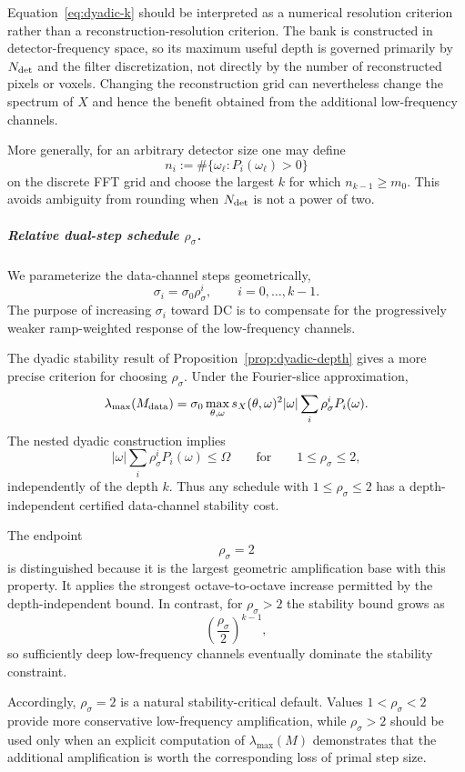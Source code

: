 \documentclass{article}
\begin{document}
Equation~\eqref{eq:dyadic-k} should be interpreted as a numerical
resolution criterion rather than a reconstruction-resolution
criterion.  The bank is constructed in detector-frequency space, so
its maximum useful depth is governed primarily by $N_{\rm det}$ and
the filter discretization, not directly by the number of reconstructed
pixels or voxels.  Changing the reconstruction grid can nevertheless
change the spectrum of $X$ and hence the benefit obtained from the
additional low-frequency channels.

More generally, for an arbitrary detector size one may define
\[
n_i
:=
\#\{\omega_\ell:P_i(\omega_\ell)>0\}
\]
on the discrete FFT grid and choose the largest $k$ for which
$n_{k-1}\ge m_0$.  This avoids ambiguity from rounding when
$N_{\rm det}$ is not a power of two.

\subparagraph{Relative dual-step schedule $\rho_\sigma$.}
We parameterize the data-channel steps geometrically,
\begin{equation}
\label{eq:dyadic-step-schedule}
\sigma_i=\sigma_0\rho_\sigma^i,
\qquad i=0,\ldots,k-1.
\end{equation}
The purpose of increasing $\sigma_i$ toward DC is to compensate for
the progressively weaker ramp-weighted response of the low-frequency
channels.

The dyadic stability result of
Proposition~\ref{prop:dyadic-depth} gives a more precise criterion for
choosing $\rho_\sigma$.  Under the Fourier-slice approximation,
\[
\lambda_{\max}(M_{\rm data})
=
\sigma_0
\max_{\theta,\omega}
s_X(\theta,\omega)^2|\omega|
\sum_i\rho_\sigma^iP_i(\omega).
\]
The nested dyadic construction implies
\[
|\omega|
\sum_i\rho_\sigma^iP_i(\omega)
\le \Omega
\qquad\text{for}\qquad
1\le\rho_\sigma\le2,
\]
independently of the depth $k$.  Thus any schedule with
$1\le\rho_\sigma\le2$ has a depth-independent certified data-channel
stability cost.

The endpoint
\[
\boxed{\rho_\sigma=2}
\]
is distinguished because it is the largest geometric amplification
base with this property.  It applies the strongest octave-to-octave
increase permitted by the depth-independent bound.  In contrast, for
$\rho_\sigma>2$ the stability bound grows as
\[
\left(\frac{\rho_\sigma}{2}\right)^{k-1},
\]
so sufficiently deep low-frequency channels eventually dominate the
stability constraint.

Accordingly, $\rho_\sigma=2$ is a natural stability-critical default.
Values $1<\rho_\sigma<2$ provide more conservative low-frequency
amplification, while $\rho_\sigma>2$ should be used only when an
explicit computation of $\lambda_{\max}(M)$ demonstrates that the
additional amplification is worth the corresponding loss of primal
step size.
\end{document}
